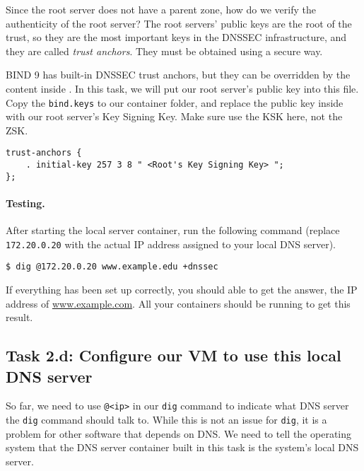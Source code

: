 Since the root server does not have a parent zone, how do we verify the authenticity 
of the root server?  The root servers' public keys are the root of the trust, so they are 
the most important keys in the DNSSEC infrastructure, and they are called \textit{trust
anchors}. They must be obtained using a secure way. 

BIND 9 has built-in DNSSEC trust anchors, but they can be 
overridden by the content inside .  
In this task, we will put our root server's public key 
into this file. Copy the \texttt{bind.keys} to our container folder,
and replace the public key inside with our root server's 
Key Signing Key. Make sure use the KSK here, not the ZSK. 


\begin{lstlisting}
trust-anchors {
    . initial-key 257 3 8 " <Root's Key Signing Key> ";
};
\end{lstlisting}


\paragraph{Testing.} After starting the local server container, run the 
following command (replace \texttt{172.20.0.20} with the actual IP 
address assigned to your local DNS server).

\begin{lstlisting}
$ dig @172.20.0.20 www.example.edu +dnssec
\end{lstlisting}

If everything has been set up correctly, you should able to get the 
answer, the IP address of \url{www.example.com}. All your containers
should be running to get this result. 



\subsection{Task 2.d: Configure our VM to use this local DNS server}

So far, we need to use \texttt{@<ip>} in our \texttt{dig} command
to indicate what DNS server the \texttt{dig} command should talk to. While this
is not an issue for \texttt{dig}, it is a problem for other software that
depends on DNS. We need to tell the operating system that the
DNS server container built in this task is the system's
local DNS server.

